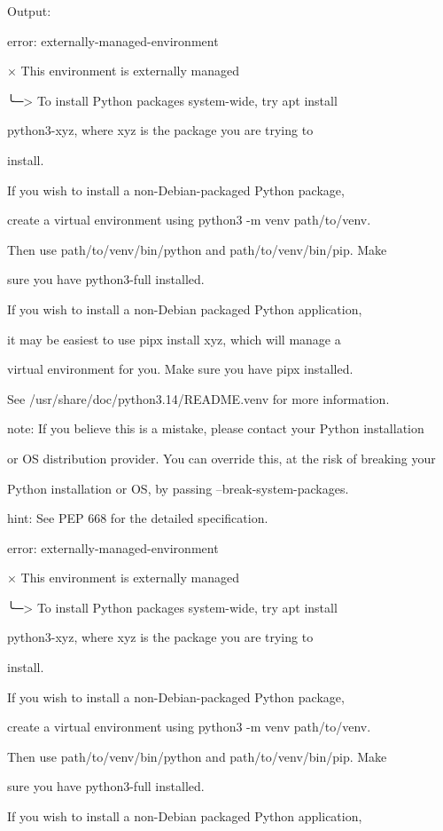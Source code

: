 \documentclass[11pt,a4paper]{article}
\begin{document}
Output:

error: externally-managed-environment


× This environment is externally managed

╰─> To install Python packages system-wide, try apt install

python3-xyz, where xyz is the package you are trying to

install.


If you wish to install a non-Debian-packaged Python package,

create a virtual environment using python3 -m venv path/to/venv.

Then use path/to/venv/bin/python and path/to/venv/bin/pip. Make

sure you have python3-full installed.


If you wish to install a non-Debian packaged Python application,

it may be easiest to use pipx install xyz, which will manage a

virtual environment for you. Make sure you have pipx installed.


See /usr/share/doc/python3.14/README.venv for more information.


note: If you believe this is a mistake, please contact your Python installation

or OS distribution provider. You can override this, at the risk of breaking your

Python installation or OS, by passing --break-system-packages.

hint: See PEP 668 for the detailed specification.

error: externally-managed-environment


× This environment is externally managed

╰─> To install Python packages system-wide, try apt install

python3-xyz, where xyz is the package you are trying to

install.


If you wish to install a non-Debian-packaged Python package,

create a virtual environment using python3 -m venv path/to/venv.

Then use path/to/venv/bin/python and path/to/venv/bin/pip. Make

sure you have python3-full installed.


If you wish to install a non-Debian packaged Python application,
\end{document}
